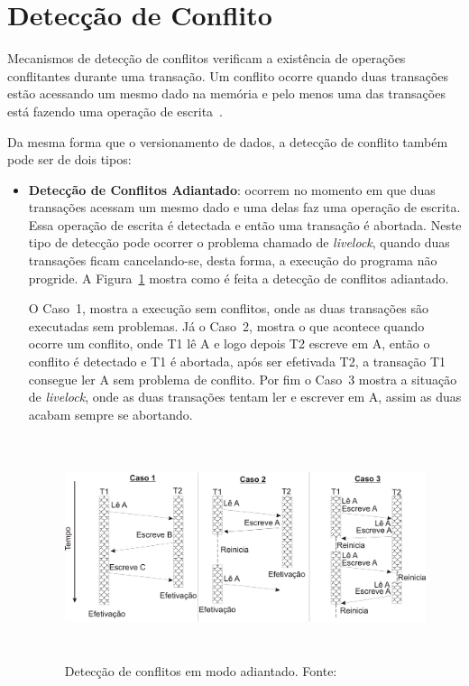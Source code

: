 \documentclass[ti]{texufpel}
\begin{document}
\section{Detecção de Conflito}

Mecanismos de detecção de conflitos verificam a existência de operações conflitantes durante uma transação. Um conflito ocorre quando duas transações estão acessando um mesmo dado na memória e pelo menos uma das transações está fazendo uma operação de escrita~\cite{baldassinTese09}.

Da mesma forma que o versionamento de dados, a detecção de conflito também pode ser de dois tipos:

\begin{itemize}
\item \textbf{Detecção de Conflitos Adiantado}: ocorrem no momento em que duas transações acessam um mesmo dado e uma delas faz uma operação de escrita. Essa operação de escrita é detectada e então uma transação é abortada. Neste tipo de detecção pode ocorrer o problema chamado de \emph{livelock}, quando duas transações ficam cancelando-se, desta forma, a execução do programa não progride. A Figura~\ref{figuradeteccaoadiantado} mostra como é feita a detecção de conflitos adiantado.

O Caso~1, mostra a execução sem conflitos, onde as duas transações são executadas sem problemas. Já o Caso~2, mostra o que acontece quando ocorre um conflito, onde T1 lê A e logo depois T2 escreve em A, então o conflito é detectado e T1 é abortada, após ser efetivada T2, a transação T1 consegue ler A sem problema de conflito. Por fim o Caso~3 mostra a situação de \emph{livelock}, onde as duas transações tentam ler e escrever em A, assim as duas acabam sempre se abortando.

\begin{figure}[!htp]
\centering
\includegraphics[height=6.5cm]{Imagens/conflitoadiantado.png}
\caption{Detecção de conflitos em modo adiantado. Fonte:~\cite{rigo07}}
\label{figuradeteccaoadiantado}
\end{figure}


\end{itemize}
\end{document}
